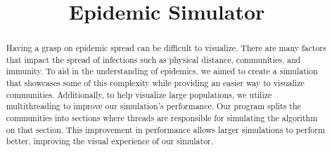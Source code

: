 \documentclass[conference]{IEEEtran}
\begin{document}
\title{Epidemic Simulator\\}


\author{
\and
{}
\and
{}
\and
{}
\and
{}
}

\maketitle

\begin{abstract}
Having a grasp on epidemic spread can be difficult to visualize. There are many factors that impact the spread of infections such as physical distance, communities, and immunity. To aid in the understanding of epidemics, we aimed to create a simulation that showcases some of this complexity while providing an easier way to visualize communities. Additionally, to help visualize large populations, we utilize multithreading to improve our simulation’s performance. Our program splits the communities into sections where threads are responsible for simulating the algorithm on that section. This improvement in performance allows larger simulations to perform better, improving the visual experience of our simulator.
\end{abstract}
\end{document}
